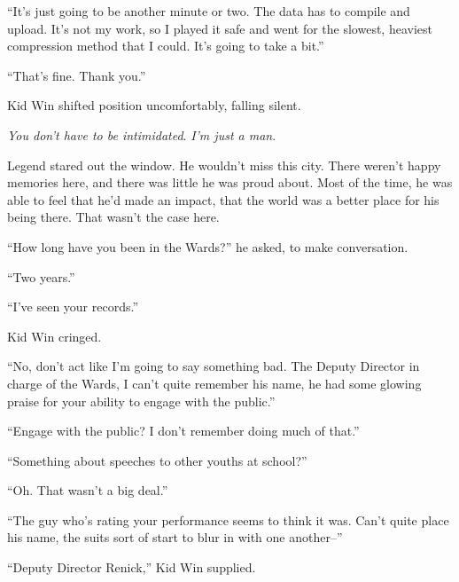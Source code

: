 





``It's just going to be another minute or two.  The data has to compile and upload.  It's not my work, so I played it safe and went for the slowest, heaviest compression method that I could.  It's going to take a bit.''



``That's fine.  Thank you.''



Kid Win shifted position uncomfortably, falling silent.



\emph{You don't have to be intimidated}.  \emph{I'm just a man}.



Legend stared out the window.  He wouldn't miss this city.  There weren't happy memories here, and there was little he was proud about.  Most of the time, he was able to feel that he'd made an impact, that the world was a better place for his being there.  That wasn't the case here.



``How long have you been in the Wards?'' he asked, to make conversation.



``Two years.''



``I've seen your records.''



Kid Win cringed.



``No, don't act like I'm going to say something bad.  The Deputy Director in charge of the Wards, I can't quite remember his name, he had some glowing praise for your ability to engage with the public.''



``Engage with the public?  I don't remember doing much of that.''



``Something about speeches to other youths at school?''



``Oh.  That wasn't a big deal.''



``The guy who's rating your performance seems to think it was.  Can't quite place his name, the suits sort of start to blur in with one another--''



``Deputy Director Renick,'' Kid Win supplied.



